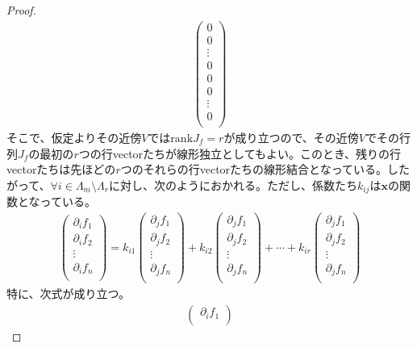 \documentclass[dvipdfmx]{jsarticle}
\begin{document}
\begin{proof}
\begin{align*}
\begin{pmatrix}
0 \\
0 \\
 \vdots \\
0 \\
0 \\
0 \\
 \vdots \\
0 \\
\end{pmatrix}
\end{align*}
そこで、仮定よりその近傍$V$では$\mathrm{rank}J_{f} = r$が成り立つので、その近傍$V$でその行列$J_{f}$の最初の$r$つの行vectorたちが線形独立としてもよい。このとき、残りの行vectorたちは先ほどの$r$つのそれらの行vectorたちの線形結合となっている。したがって、$\forall i \in \varLambda_{m} \setminus \varLambda_{r}$に対し、次のようにおかれる。ただし、係数たち$k_{ij}$は$\mathbf{x}$の関数となっている。
\begin{align*}
\begin{pmatrix}
  \partial_{i}f_{1} \\
  \partial_{i}f_{2} \\
   \vdots \\
  \partial_{i}f_{n} \\
\end{pmatrix} = k_{i1} \begin{pmatrix}
  \partial_{j}f_{1} \\
  \partial_{j}f_{2} \\
   \vdots \\
  \partial_{j}f_{n} \\
\end{pmatrix} + k_{i2} \begin{pmatrix}
  \partial_{j}f_{1} \\
  \partial_{j}f_{2} \\
   \vdots \\
  \partial_{j}f_{n} \\
\end{pmatrix} + \cdots + k_{ir} \begin{pmatrix}
  \partial_{j}f_{1} \\
  \partial_{j}f_{2} \\
   \vdots \\
  \partial_{j}f_{n} \\
\end{pmatrix}
\end{align*}
特に、次式が成り立つ。
\begin{align*}
\begin{pmatrix}
  \partial_{i}f_{1} \\

\end{pmatrix}
\end{align*}
\end{proof}
\end{document}
